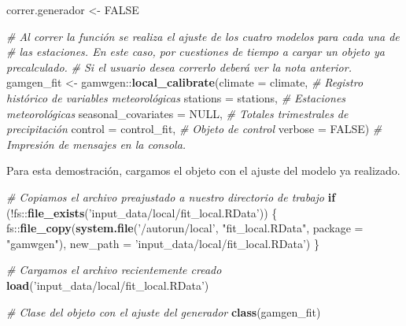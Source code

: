 \documentclass[
]{article}
\newenvironment{Shaded}{}{}
\newcommand{\CommentTok}[1]{\textcolor[rgb]{0.38,0.63,0.69}{\textit{#1}}}
\newcommand{\ControlFlowTok}[1]{\textcolor[rgb]{0.00,0.44,0.13}{\textbf{#1}}}
\newcommand{\DataTypeTok}[1]{\textcolor[rgb]{0.56,0.13,0.00}{#1}}
\newcommand{\KeywordTok}[1]{\textcolor[rgb]{0.00,0.44,0.13}{\textbf{#1}}}
\newcommand{\NormalTok}[1]{#1}
\newcommand{\OperatorTok}[1]{\textcolor[rgb]{0.40,0.40,0.40}{#1}}
\newcommand{\OtherTok}[1]{\textcolor[rgb]{0.00,0.44,0.13}{#1}}
\newcommand{\StringTok}[1]{\textcolor[rgb]{0.25,0.44,0.63}{#1}}
\begin{document}
\begin{Shaded}
\begin{Highlighting}[]
\NormalTok{correr.generador <-}\StringTok{ }\OtherTok{FALSE}
\end{Highlighting}
\end{Shaded}

\begin{Shaded}
\begin{Highlighting}[]
\CommentTok{# Al correr la función se realiza el ajuste de los cuatro modelos para cada una de }
\CommentTok{# las estaciones. En este caso, por cuestiones de tiempo a cargar un objeto ya precalculado. }
\CommentTok{# Si el usuario desea correrlo deberá ver la nota anterior.}
\NormalTok{gamgen_fit <-}\StringTok{ }\NormalTok{gamwgen}\OperatorTok{::}\KeywordTok{local_calibrate}\NormalTok{(}\DataTypeTok{climate =}\NormalTok{ climate, }\CommentTok{# Registro histórico de variables meteorológicas}
  \DataTypeTok{stations =}\NormalTok{ stations, }\CommentTok{# Estaciones meteorológicas }
  \DataTypeTok{seasonal_covariates =} \OtherTok{NULL}\NormalTok{, }\CommentTok{# Totales trimestrales de precipitación}
  \DataTypeTok{control =}\NormalTok{ control_fit, }\CommentTok{# Objeto de control}
  \DataTypeTok{verbose =} \OtherTok{FALSE}\NormalTok{) }\CommentTok{# Impresión de mensajes en la consola.}
\end{Highlighting}
\end{Shaded}

Para esta demostración, cargamos el objeto con el ajuste del modelo ya realizado.

\begin{Shaded}
\begin{Highlighting}[]
\CommentTok{# Copiamos el archivo preajustado a nuestro directorio de trabajo}
\ControlFlowTok{if}\NormalTok{ (}\OperatorTok{!}\NormalTok{fs}\OperatorTok{::}\KeywordTok{file_exists}\NormalTok{(}\StringTok{'input_data/local/fit_local.RData'}\NormalTok{)) \{}
\NormalTok{  fs}\OperatorTok{::}\KeywordTok{file_copy}\NormalTok{(}\KeywordTok{system.file}\NormalTok{(}\StringTok{'/autorun/local'}\NormalTok{, }\StringTok{"fit_local.RData"}\NormalTok{,  }\DataTypeTok{package =} \StringTok{"gamwgen"}\NormalTok{),}
              \DataTypeTok{new_path =} \StringTok{'input_data/local/fit_local.RData'}\NormalTok{)}
\NormalTok{\}}

\CommentTok{# Cargamos el archivo recientemente creado}
\KeywordTok{load}\NormalTok{(}\StringTok{'input_data/local/fit_local.RData'}\NormalTok{)}

\CommentTok{# Clase del objeto con el ajuste del generador}
\KeywordTok{class}\NormalTok{(gamgen_fit)}
\end{Highlighting}
\end{Shaded}
\end{document}
